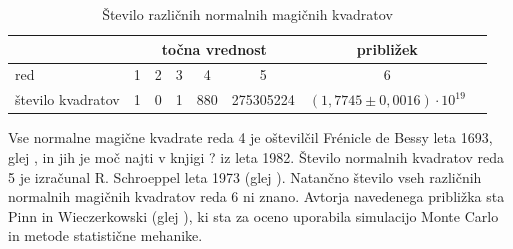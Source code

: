 \documentclass[a4paper,12pt]{article}
\begin{document}
\begin{table}[!ht]
\centering
\caption{Število različnih normalnih magičnih kvadratov}
\label{table:stevila}
\begin{tabular}{lccccccc}\toprule
      & \multicolumn{5}{c}{točna vrednost} & približek \\ \midrule
      red & 1 & 2 & 3 & 4 & 5 & 6 \\ 
      število kvadratov & 1 & 0 & 1 & 880 & 275305224 & \((1{,}7745\pm 0{,}0016)\cdot 10^{19}\) \\ 
      \bottomrule  
\end{tabular} 
\end{table}

Vse normalne magične kvadrate reda 4 je oštevilčil Frénicle de Bessy
leta 1693, glej \cite{bessy}, in jih je moč najti v knjigi \cite{berlekamp}?
iz leta 1982. Število normalnih kvadratov reda 5 je izračunal
R. Schroeppel leta 1973 (glej \cite{gardner}).
Natančno število vseh različnih normalnih magičnih kvadratov reda 6 ni znano.
Avtorja navedenega približka sta Pinn in Wieczerkowski (glej \cite{pinn}), ki
sta za oceno uporabila simulacijo Monte Carlo in metode statistične mehanike.


\newpage


 
\end{document}
